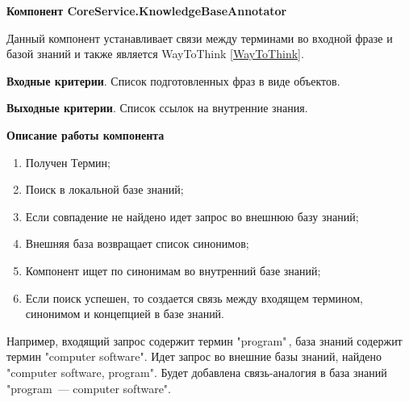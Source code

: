 \textbf{Компонент CoreService.KnowledgeBaseAnnotator}\par 
Данный компонент устанавливает связи между терминами во входной фразе и базой знаний и также является WayToThink \ref{WayToThink}.  \par
\textbf{Входные критерии}. Список подготовленных фраз в виде объектов. \par
\textbf{Выходные критерии}. Список ссылок на внутренние знания. \par
\textbf{Описание работы компонента} \par
\begin{enumerate}
	\item Получен Термин;
	\item Поиск в локальной базе знаний;
	\item Если совпадение не найдено идет запрос во внешнюю базу знаний;
	\item Внешняя база возвращает список синонимов;
	\item Компонент ищет по синонимам во внутренний базе знаний;
	\item Если поиск успешен, то создается связь между входящем термином, синонимом и концепцией в базе знаний.
\end{enumerate}
Например, входящий запрос содержит термин "program"\,, база знаний содержит термин "computer software". Идет запрос во внешние базы знаний, найдено "computer software, program". Будет добавлена связь-аналогия в база знаний "program~--- computer software". 


